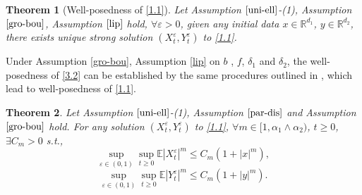 \documentclass[11pt,reqno]{amsart}
\newtheorem{theorem}{\indent Theorem}[section]
\numberwithin{equation}{section}
\begin{document}
\begin{theorem}[Well-posedness of \eqref{1.1}]\label{T31}
Let  Assumption $\ref{uni-ell}$-(1), Assumption $\ref{gro-bou}$, Assumption $\ref{lip}$ hold, $\forall \varepsilon >0$, given any initial data $x\in \mathbb{R}^{d_{1} }$, $y \in \mathbb{R}^{d_{2} }$, there exists unique strong solution $(X_{t}^{\varepsilon},Y_{t}^{\varepsilon})$ to \eqref{1.1}.
\end{theorem}
Under Assumption \ref{gro-bou}, Assumption \ref{lip} on $b$ , $f$, $\delta_{1}$ and $\delta_{2}$,	the well-posedness of \eqref{3.2} can be  established by the same procedures outlined in  \cite[Theorem 6.2.3, Theorem 6.2.9, Theorem 6.2.11]{DA}, which lead to well-posedness of \eqref{1.1}.
\begin{theorem}\label{T32}
Let  Assumption $\ref{uni-ell}$-(1), Assumption $\ref{par-dis}$ and  Assumption $\ref{gro-bou}$ hold.	For any solution $(X_{t}^{\varepsilon},Y_{t}^{\varepsilon})$ to \eqref{1.1}, $\forall m\in [1,\alpha_{1}\wedge\alpha_{2})$,  $t\geq0$, $\exists C_{m}>0$ s.t.,
	\begin{equation}\label{3.4}
		\sup_{\varepsilon\in (0,1)}\sup_{t\geq0} \mathbb{E}|X_{t}^{\varepsilon}|^{m}\leq C_{m}(1+|x|^{m}),
	\end{equation}
	\begin{equation}\label{3.6}
		\sup_{\varepsilon\in (0,1)}\sup_{t\geq0}\mathbb{E} |Y_{t}^{\varepsilon}|^{m}\leq  C_{m}(1+|y|^{m}).
	\end{equation}
\end{theorem}
\end{document}
